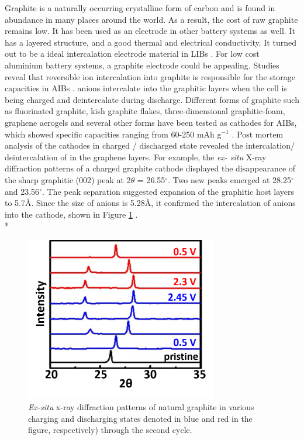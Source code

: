 Graphite is a naturally occurring crystalline form of carbon and is found in abundance in many places around the world. As a result, the cost of raw graphite remains low. It has been used as an electrode in other battery systems as well. It has a layered structure, and a good thermal and electrical conductivity. It turned out to be a ideal intercalation electrode material in LIBs \cite{ji_recent_2011, yoo_large_2008, lian_large_2010}. For low cost aluminium battery systems, a graphite electrode could be appealing. Studies reveal that reversible ion intercalation into graphite is responsible for the storage capacities in AIBs \cite{rani_fluorinated_2013-1, lin_ultrafast_2015-3}.  anions intercalate into the graphitic layers when the cell is being charged and deintercalate during discharge. Different forms of graphite such as fluorinated graphite, kish graphite flakes, three-dimensional graphitic-foam, graphene aerogels and several other forms have been tested as cathodes for AIBs, which showed specific capacities ranging from 60-250 mAh g$^{-1}$ \cite{rani_fluorinated_2013-1, wang_kish_2017-1, wu_3d_2016, huang_graphene_2019}. Post mortem analysis of the cathodes in charged / discharged state revealed the intercalation/ deintercalation of  in the graphene layers. For example, the \textit{ex- situ} X-ray diffraction patterns of a charged graphite cathode displayed the disappearance of the sharp graphitic (002) peak at 2$\theta$ = 26.55$^{\circ}$. Two new peaks emerged at 28.25$^{\circ}$ and 23.56$^{\circ}$. The peak separation suggested expansion of the graphitic host layers to 5.7\AA. Since the size of  anions is 5.28\AA, it confirmed the intercalation of  anions into the cathode, shown in Figure \ref{Figures/chap5fig:ramanpap} \cite{lin_ultrafast_2015-3, wang_kish_2017-1}. \\*

 \begin{figure}[h]
  \centering
  \includegraphics[width=0.75\textwidth]{Figures/chap5fig/ramanpap}
    \caption{\textit{Ex-situ} x-ray diffraction patterns of natural graphite in various charging and discharging states denoted in blue and red in the figure, respectively) through the second cycle. \cite{wang_advanced_2017}}
  \label{Figures/chap5fig:ramanpap}
\end{figure}

